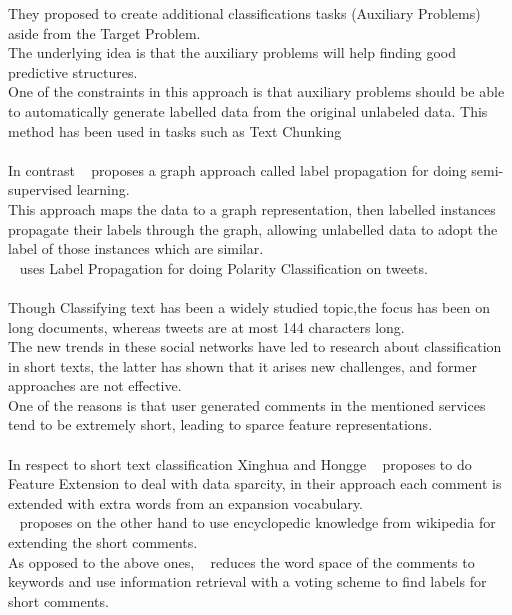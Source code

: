 \documentclass[4pt,a4paper,twocolumn]{article}
\begin{document}
They proposed to create additional classifications tasks (Auxiliary Problems) aside from the Target Problem.\\
The underlying idea is that the auxiliary problems will help finding good predictive structures.\\
One of the constraints in this approach is that auxiliary problems should be  able to automatically generate labelled data from the original unlabeled data.
This method has been used in tasks such as Text Chunking ~\cite{Ando:2005:HSL:1219840.1219841}\\
\\
In contrast ~\cite{Zhu:2005:SLG:1104523} proposes a graph approach called label propagation for
doing semi-supervised learning.\\
This approach maps the data to a graph representation, then labelled instances propagate their labels through the graph, allowing unlabelled data to adopt the label of those instances which are similar.\\
~\cite{Speriosu_twitterpolarity} uses Label Propagation for doing Polarity Classification on tweets.\\
\\
Though Classifying text has been a widely studied topic,the focus has been on long documents,
whereas tweets are at most 144 characters long.\\
The new trends in these social networks have led to research about classification in short texts, the latter has  shown that it arises new challenges, and former approaches are not  effective.\\
One of the reasons is that  user generated comments in the mentioned services tend to be extremely short, leading to sparce feature representations.\\
\\
In respect to short text classification Xinghua and Hongge ~\cite{Fan:2010:NMC:1916732.1917677} proposes  to do Feature Extension to deal with data sparcity, in their approach each comment is extended with extra words from an expansion vocabulary.\\
~\cite{Gabrilovich:2006:OBB:1597348.1597395} proposes on the other hand to use encyclopedic knowledge from wikipedia for extending the short comments.\\
As opposed to the above ones,  ~\cite{Sun:2012:STC:2348283.2348511} reduces the word space of the comments to keywords and use information retrieval with a voting scheme to find labels for short comments.\\
\end{document}
